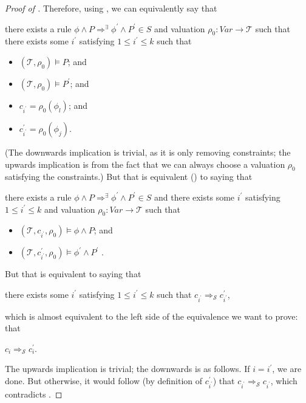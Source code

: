 \begin{proof}[Proof of ]
Therefore, using , we can equivalently say that
\begin{proofenv}
there exists a rule $\phi \land P \Rightarrow^\exists \phi^\prime \land P^\prime \in S$
and valuation $\rho_0 : \mathit{Var} \to \mathcal{T}$ such that
there exists some $i^\prime$ satisfying $1 \leq i^\prime \leq k$
such that
\begin{itemize}
    \item $(\mathcal{T}, \rho_0) \vDash P$; and
    \item $(\mathcal{T}, \rho_0) \vDash P^\prime$; and
    \item $c_{i^\prime} = \rho_0(\phi_l)$; and
    \item $c^\prime_{i^\prime} = \rho_0(\phi_j)$.
\end{itemize}
\end{proofenv}
(The downwards implication is trivial, as it is only removing constraints; the upwards implication
is from the fact that we can always choose a valuation $\rho_0$ satisfying the constraints.)
But that is equivalent () to saying that 
\begin{proofenv}
there exists a rule $\phi \land P \Rightarrow^\exists \phi^\prime \land P^\prime \in S$
and there exists some $i^\prime$ satisfying $1 \leq i^\prime \leq k$
and valuation $\rho_0 : \mathit{Var} \to \mathcal{T}$ such that
\begin{itemize}
    \item $(\mathcal{T}, c_{i^\prime}, \rho_0) \vDash \phi \land P$; and
    \item $(\mathcal{T}, c^\prime_{i^\prime}, \rho_0) \vDash \phi^\prime \land P^\prime$
    .
\end{itemize}
\end{proofenv}
But that is
equivalent to saying that
\begin{proofenv}
there exists some $i^\prime$ satisfying $1 \leq i^\prime \leq k$
such that $c_{i^\prime} \Rightarrow_{\mathcal{S}} c^\prime_{i^\prime}$,
\end{proofenv}
which is almost equivalent to the left side of the equivalence we want to prove:
that
\begin{proofenv}
$c_{i} \Rightarrow_{\mathcal{S}} c^\prime_{i}$.
\end{proofenv}
The upwards implication is trivial; the downwards is as follows. If $i = i^\prime$, we are done.
But otherwise, it would follow (by definition of $c^\prime_{i^\prime}$) that $c_{i^\prime} \Rightarrow_{\mathcal{S}} c_{i^\prime}$,
which contradicts .
\end{proof}

